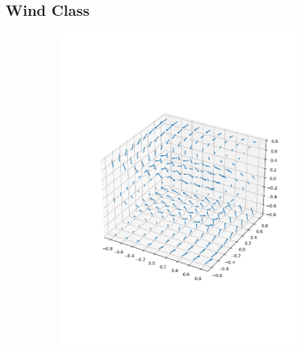 \subsection{Wind Class}\label{sec:wind}
\begin{figure}
	\centering
	\begin{subfigure}{0.32\linewidth}
		\includegraphics[width=\linewidth]{figures/wind4.png}
		\caption{}
		\label{eq:wind5}
	\end{subfigure}
	\begin{subfigure}{0.32\linewidth}

\end{subfigure}
\end{figure}
